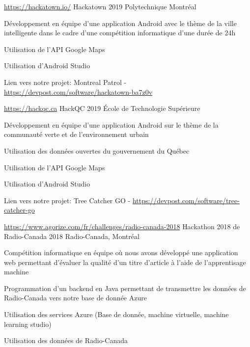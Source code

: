 \begin{cventries}
  \cventry
  {\url{https://hackatown.io/}}
    {Hackatown}
    {2019}
    {Polytechnique Montréal}
    {
      \begin{cvitems}
      \item {Développement en équipe d'une application Android avec le thème de la ville intelligente dans le cadre d'une compétition informatique d'une durée de 24h}
      \item{Utilisation de l'API Google Maps}
      \item{Utilisation d'Android Studio}
        \item {Lien vers notre projet: Montreal Patrol - \url{https://devpost.com/software/hackatown-ba7z0v}}
      \end{cvitems}
    }
  \cventry
  {\url{https://hackqc.ca}}
    {HackQC}
    {2019}
    {École de Technologie Supérieure}
    {
      \begin{cvitems}
      \item{Développement en équipe d'une application Android sur le thème de la communauté verte et de l'environnement urbain}
      \item{Utilisation des données ouvertes du gouvernement du Québec} 
      \item{Utilisation de l'API Google Maps}
      \item{Utilisation d'Android Studio}
        \item{Lien vers notre projet: Tree Catcher GO - \url{https://devpost.com/software/tree-catcher-go}}
      \end{cvitems}
    }
  \cventry
  {\url{https://www.agorize.com/fr/challenges/radio-canada-2018}}
  {Hackathon 2018 de Radio-Canada}
    {2018}
    {Radio-Canada, Montréal}
    {
      \begin{cvitems}
      \item{Compétition informatique en équipe où nous avons développé une application web permettant d'évaluer la qualité d'un titre d'article à l'aide de l'apprentisage machine}
      \item{Programmation d'un backend en Java permettant de transmettre les données de Radio-Canada vers notre base de donnée Azure}
      \item{Utilisation des services Azure (Base de donnée, machine virtuelle, machine learning studio)}
      \item{Utilisation des données de Radio-Canada}
      \end{cvitems}
}
\end{cventries}
